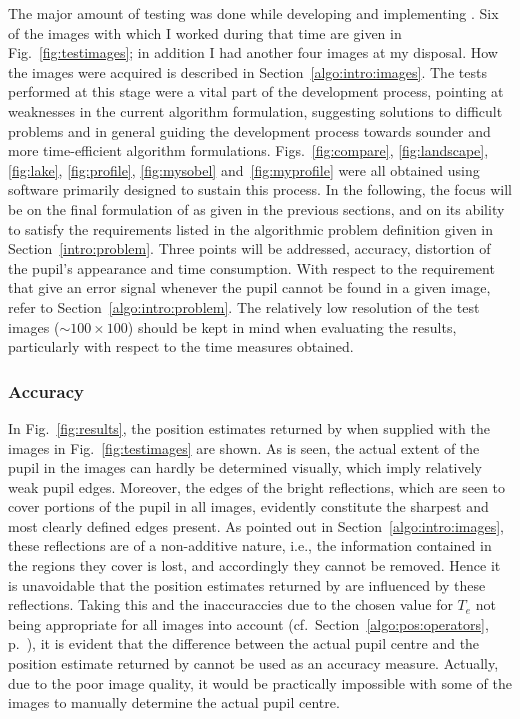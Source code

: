 The major amount of testing was done while developing and implementing
{\octopus}.  Six of the images with which I worked during that time
are given in Fig.~\ref{fig:testimages}; in addition I had another four
images at my disposal.  How the images were acquired is described in
Section~\ref{algo:intro:images}.  The tests performed at this stage
were a vital part of the development process, pointing at weaknesses
in the current algorithm formulation, suggesting solutions to
difficult problems and in general guiding the development process
towards sounder and more time-efficient algorithm formulations.
Figs.~\ref{fig:compare}, \ref{fig:landscape}, \ref{fig:lake},
\ref{fig:profile}, \ref{fig:mysobel} and~\ref{fig:myprofile} were all
obtained using software primarily designed to sustain this process.
In the following, the focus will be on the final formulation of
{\octopus} as given in the previous sections, and on its ability to
satisfy the requirements listed in the algorithmic problem definition
given in Section~\ref{intro:problem}.  Three points will be addressed,
accuracy, distortion of the pupil's appearance and time consumption.
With respect to the requirement that {\octopus} give an error signal
whenever the pupil cannot be found in a given image, refer to
Section~\ref{algo:intro:problem}.  The relatively low resolution of
the test images ($\sim 100\times 100$) should be kept in mind when
evaluating the results, particularly with respect to the time measures
obtained.

\subsubsection{Accuracy}

In Fig.~\ref{fig:results}, the position estimates returned by
{\octopus} when supplied with the images in Fig.~\ref{fig:testimages}
are shown.  As is seen, the actual extent of the pupil in the images
can hardly be determined visually, which imply relatively weak pupil
edges.  Moreover, the edges of the bright reflections, which are seen
to cover portions of the pupil in all images, evidently constitute the
sharpest and most clearly defined edges present.  As pointed out in
Section~\ref{algo:intro:images}, these reflections are of a
non-additive nature, i.e., the information contained in the regions
they cover is lost, and accordingly they cannot be removed.  Hence it
is unavoidable that the position estimates returned by {\octopus} are
influenced by these reflections.  Taking this and the inaccuraccies
due to the chosen value for $T_{e}$ not being appropriate for all
images into account (cf.\ Section~\ref{algo:pos:operators},
p.~\pageref{pg:TEproblems}), it is evident that the difference between
the actual pupil centre and the position estimate returned by
{\octopus} cannot be used as an accuracy measure.  Actually, due to
the poor image quality, it would be practically impossible with some
of the images to manually determine the actual pupil centre.


